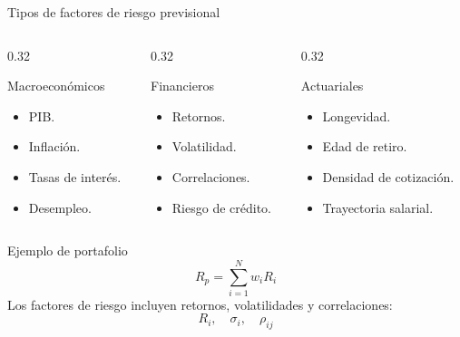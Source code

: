 \documentclass[10pt,aspectratio=169]{beamer}
\begin{document}
\begin{frame}{Tipos de factores de riesgo previsional}
\begin{columns}[T]

\begin{column}{0.32\textwidth}
\begin{block}{Macroeconómicos}
\begin{itemize}
    \item PIB.
    \item Inflación.
    \item Tasas de interés.
    \item Desempleo.
\end{itemize}
\end{block}
\end{column}

\begin{column}{0.32\textwidth}
\begin{block}{Financieros}
\begin{itemize}
    \item Retornos.
    \item Volatilidad.
    \item Correlaciones.
    \item Riesgo de crédito.
\end{itemize}
\end{block}
\end{column}

\begin{column}{0.32\textwidth}
\begin{block}{Actuariales}
\begin{itemize}
    \item Longevidad.
    \item Edad de retiro.
    \item Densidad de cotización.
    \item Trayectoria salarial.
\end{itemize}
\end{block}
\end{column}

\end{columns}

\vspace{0.45cm}
\begin{exampleblock}{Ejemplo de portafolio}
\[
R_p = \sum_{i=1}^{N} w_i R_i
\]
Los factores de riesgo incluyen retornos, volatilidades y correlaciones:
\[
R_i,\quad \sigma_i,\quad \rho_{ij}
\]
\end{exampleblock}
\end{frame}
\end{document}
